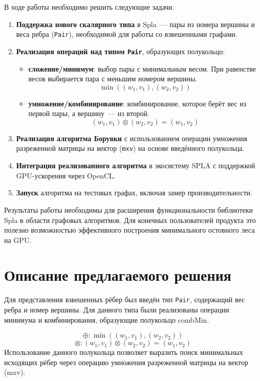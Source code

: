 \documentclass[a4paper]{article}
\begin{document}
В ходе работы необходимо решить следующие задачи.

\begin{enumerate}
    \item \textbf{Поддержка нового скалярного типа} в Spla~--- пары из номера вершины и веса ребра (\texttt{Pair}), необходимой для работы со взвешенными графами.
    
    \item \textbf{Реализация операций над типом \texttt{Pair}}, образующих полукольцо:
    \begin{itemize}
        \item[$\oplus$] \textbf{сложение/минимум}: выбор пары с минимальным весом. При равенстве весов выбирается пара с меньшим номером вершины.
        \[
        \min((w_1, v_1), (w_2, v_2))
        \]
        \item[$\otimes$] \textbf{умножение/комбинирование}: комбинирование, которое берёт вес из первой пары, а вершину~--- из второй.
        \[
        (w_1, v_1) \otimes (w_2, v_2) = (w_1, v_2)
        \]
    \end{itemize}
    
    \item \textbf{Реализация алгоритма Борувки} с использованием операции умножения разреженной матрицы на вектор (\texttt{mxv}) на основе введённого полукольца.
    
    \item \textbf{Интеграция реализованного алгоритма} в экосистему SPLA с поддержкой GPU-ускорения через OpenCL.
    
    \item \textbf{Запуск} алгоритма на тестовых графах, включая замер производительности.
\end{enumerate}

Результаты работы необходимы для расширения функциональности библиотеки Spla в области графовых алгоритмов. Для конечных пользователей продукта это полезно возможностью эффективного построения минимального остовного леса на GPU. 

\section{Описание предлагаемого решения}
Для представления взвешенных рёбер был введён тип \texttt{Pair}, содержащий вес ребра и номер вершины. Для данного типа были реализованы операции минимума и комбинирования, образующие полукольцо combMin.

\[ \oplus : \min((w_1, v_1), (w_2, v_2)) \]
\[\otimes : (w_1, v_1) \otimes (w_2, v_2) = (w_1, v_2)\]
Использование данного полукольца позволяет выразить поиск минимальных исходящих рёбер через операцию умножения разреженной матрицы на вектор (mxv).
\end{document}
